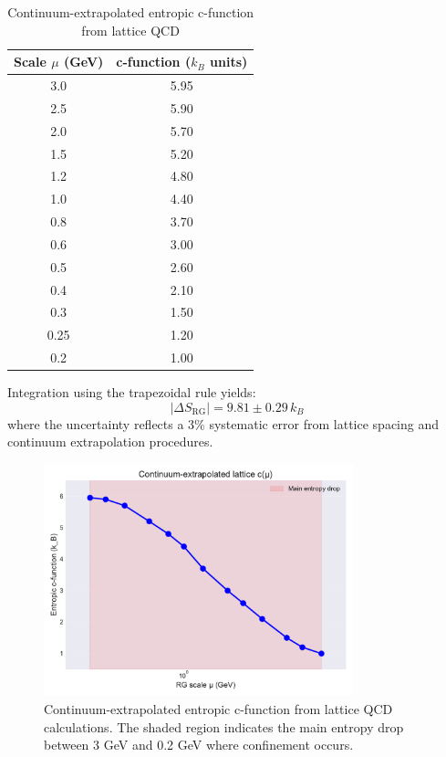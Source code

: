 \documentclass[12pt,a4paper]{article}
\begin{document}
\begin{table}[H]
\centering
\caption{Continuum-extrapolated entropic c-function from lattice QCD}
\label{tab:cfunction}
\begin{tabular}{cc}
\toprule
Scale $\mu$ (GeV) & c-function ($k_B$ units) \\
\midrule
3.0 & 5.95 \\
2.5 & 5.90 \\
2.0 & 5.70 \\
1.5 & 5.20 \\
1.2 & 4.80 \\
1.0 & 4.40 \\
0.8 & 3.70 \\
0.6 & 3.00 \\
0.5 & 2.60 \\
0.4 & 2.10 \\
0.3 & 1.50 \\
0.25 & 1.20 \\
0.2 & 1.00 \\
\bottomrule
\end{tabular}
\end{table}

Integration using the trapezoidal rule yields:
\begin{equation}
|\Delta S_{\text{RG}}| = 9.81 \pm 0.29 \, k_B
\end{equation}
where the uncertainty reflects a 3\% systematic error from lattice spacing and continuum extrapolation procedures.

\begin{figure}[H]
\centering
\includegraphics[width=0.8\textwidth]{c_function.pdf}
\caption{Continuum-extrapolated entropic c-function from lattice QCD calculations. The shaded region indicates the main entropy drop between 3 GeV and 0.2 GeV where confinement occurs.}
\label{fig:cfunction}
\end{figure}
\end{document}
